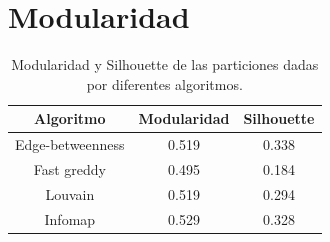 \section{Modularidad}

\begin{table}
\centering
\begin{tabular}{c c c}
\hline \hline
Algoritmo & Modularidad & Silhouette \\
\hline
Edge-betweenness & 0.519 & 0.338 \\
Fast greddy & 0.495 & 0.184 \\
Louvain & 0.519 & 0.294 \\
Infomap & 0.529 & 0.328 \\
\hline\hline
\end{tabular}
\caption{Modularidad y Silhouette de las particiones dadas por diferentes algoritmos.}
\label{table:Modularidad}
\end{table}


